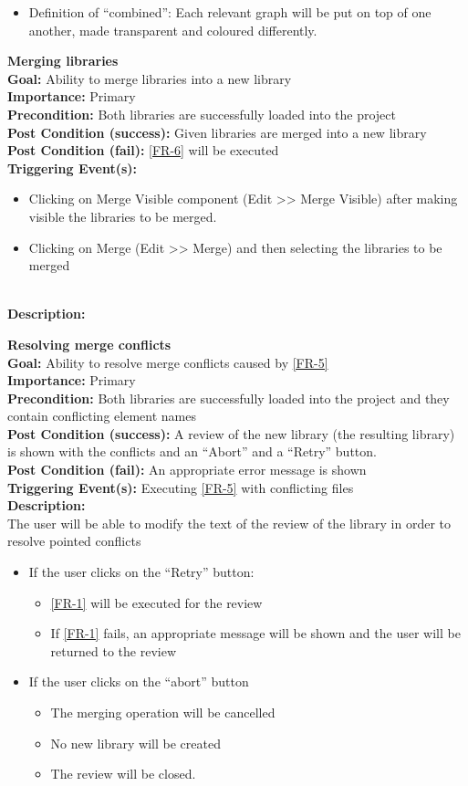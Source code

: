 \documentclass[10pt,a4paper]{report}
\newcommand{\precondition}[1]{
    \textbf{Precondition: } #1 \leavevmode \\
}
\newcommand{\FRDescription}[8]{
    \textbf{#1} \leavevmode \\
    \textbf{Goal: } #2 \leavevmode \\
    \textbf{Importance: } #3 \leavevmode \\
    \precondition{#4}
    \textbf{Post Condition (success): } #5 \leavevmode \\
    \textbf{Post Condition (fail): } #6 \leavevmode \\
    \textbf{Triggering Event(s): } #7 \leavevmode \\
    \textbf{Description: } \leavevmode \\ 
    #8}
\begin{document}
\begin{FR}
    {\begin{itemize}
        \item Definition of “combined”: Each relevant graph will be put on top of one another, made transparent and coloured differently.
    \end{itemize}}
    \item \FRDescription{Merging libraries}
    {Ability to merge libraries into a new library}
    {Primary}
    {Both libraries are successfully loaded into the project}
    {Given libraries are merged into a new library}
    {\ref{FR-6} will be executed}
    {\begin{itemize}
        \item Clicking on Merge Visible component (Edit >> Merge Visible) after making visible the libraries to be merged.
        \item Clicking on Merge (Edit >> Merge) and then selecting the libraries to be merged
    \end{itemize}}
    \item \FRDescription{Resolving merge conflicts}
    {Ability to resolve merge conflicts caused by \ref{FR-5}}
    {Primary}
    {Both libraries are successfully loaded into the project and they contain conflicting element names}
    {A review of the new library (the resulting library) is shown with the conflicts and an “Abort” and a “Retry” button.}
    {An appropriate error message is shown}
    {Executing \ref{FR-5} with conflicting files}
    {The user will be able to modify the text of the review of the library in order to resolve pointed conflicts
    \begin{itemize}
        \item If the user clicks on the “Retry” button:
        \begin{itemize}
            \item \ref{FR-1} will be executed for the review
            \item If \ref{FR-1} fails, an appropriate message will be shown and the user will be returned to the review
        \end{itemize}
        \item If the user clicks on the “abort” button
        \begin{itemize}
            \item The merging operation will be cancelled
            \item No new library will be created
            \item The review will be closed.
        \end{itemize}

\end{itemize}}
\end{FR}
\end{document}
